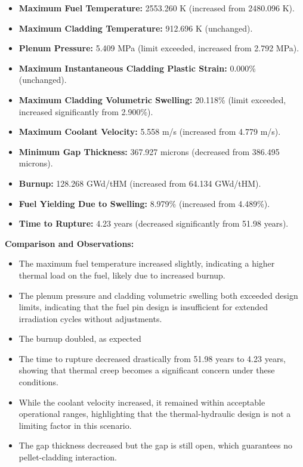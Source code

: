 \documentclass[11pt,a4paper,twoside]{article}
\begin{document}
\begin{itemize}
    \item {\color{green}\checkmark} \textbf{Maximum Fuel Temperature:} 2553.260 K (increased from 2480.096 K).
    \item \textbf{Maximum Cladding Temperature:} 912.696 K (unchanged).
    \item {\color{red}\texttimes} \textbf{Plenum Pressure:} 5.409 MPa (limit exceeded, increased from 2.792 MPa).
    \item \textbf{Maximum Instantaneous Cladding Plastic Strain:} 0.000\% (unchanged).
    \item \textbf{Maximum Cladding Volumetric Swelling:} 20.118\% (limit exceeded, increased significantly from 2.900\%).
    \item \textbf{Maximum Coolant Velocity:} 5.558 m/s (increased from 4.779 m/s).
    \item \textbf{Minimum Gap Thickness:} 367.927 microns (decreased from 386.495 microns).
    \item \textbf{Burnup:} 128.268 GWd/tHM (increased from 64.134 GWd/tHM).
    \item \textbf{Fuel Yielding Due to Swelling:} 8.979\% (increased from 4.489\%).
    \item \textbf{Time to Rupture:} 4.23 years (decreased significantly from 51.98 years).
\end{itemize}

\textbf{Comparison and Observations:}
\begin{itemize}
    \item The maximum fuel temperature increased slightly, indicating a higher thermal load on the fuel, likely due to increased burnup.
    \item The plenum pressure and cladding volumetric swelling both exceeded design limits, indicating that the fuel pin design is insufficient for extended irradiation cycles without adjustments.
    \item The burnup doubled, as expected
    \item The time to rupture decreased drastically from 51.98 years to 4.23 years, showing that thermal creep becomes a significant concern under these conditions.
    \item While the coolant velocity increased, it remained within acceptable operational ranges, highlighting that the thermal-hydraulic design is not a limiting factor in this scenario.
    \item The gap thickness decreased but the gap is still open, which guarantees no pellet-cladding interaction.
\end{itemize}
\end{document}
